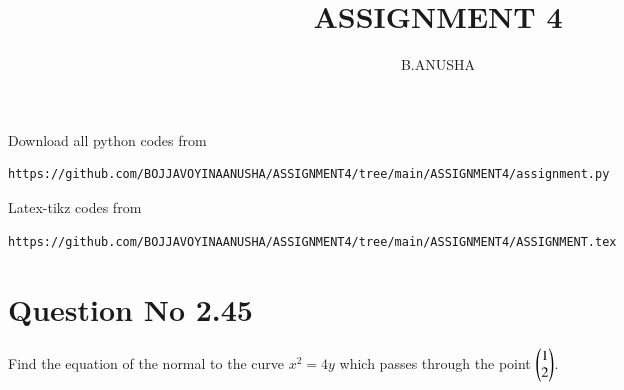 \documentclass[journal,12pt,twocolumn]{IEEEtran}
\begin{document}
     \def\rightbox#1{\makebox[0in][r]{#1}}
     \def\centbox#1{\makebox[0in]{#1}}
     \def\topbox#1{\raisebox{-\baselineskip}[0in][0in]{#1}}
     \def\midbox#1{\raisebox{-0.5\baselineskip}[0in][0in]{#1}}
\vspace{3cm}
\title{ASSIGNMENT 4}
\author{B.ANUSHA}
\maketitle
\newpage
\bigskip
\renewcommand{\thefigure}{\theenumi}
\renewcommand{\thetable}{\theenumi}
Download all python codes from 
\begin{lstlisting}
https://github.com/BOJJAVOYINAANUSHA/ASSIGNMENT4/tree/main/ASSIGNMENT4/assignment.py
\end{lstlisting}
%
Latex-tikz codes from 
%
\begin{lstlisting}
https://github.com/BOJJAVOYINAANUSHA/ASSIGNMENT4/tree/main/ASSIGNMENT4/ASSIGNMENT.tex
\end{lstlisting}
%
\section{Question No 2.45}
Find the equation of the normal to the curve $x^2 = 4y$ which passes through the point $\begin{pmatrix}1\\2\end{pmatrix}$.
\end{document}
